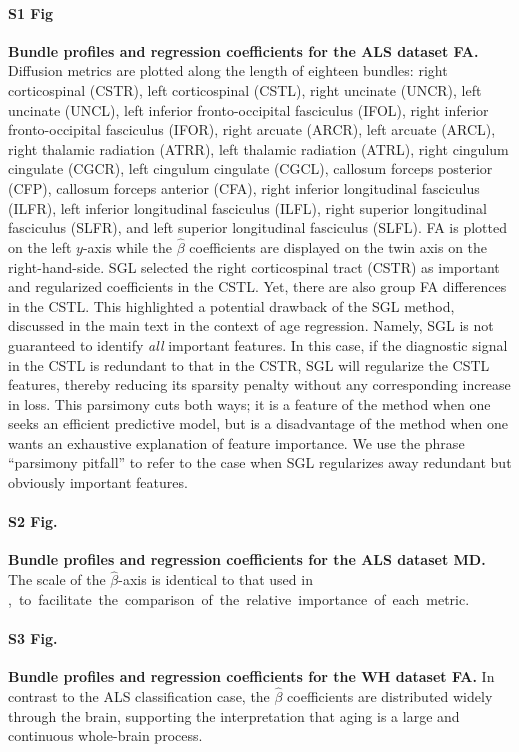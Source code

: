 \documentclass[10pt,letterpaper]{article}
\begin{document}
\paragraph{S1 Fig}
\label{S1_Fig}
{\bf Bundle profiles and regression coefficients for the ALS dataset FA.}
Diffusion metrics are plotted
along the length of eighteen bundles:
right corticospinal (CSTR),
left corticospinal (CSTL),
right uncinate (UNCR),
left uncinate (UNCL),
left inferior fronto-occipital fasciculus (IFOL),
right inferior fronto-occipital fasciculus (IFOR),
right arcuate (ARCR),
left arcuate (ARCL),
right thalamic radiation (ATRR),
left thalamic radiation (ATRL),
right cingulum cingulate (CGCR),
left cingulum cingulate (CGCL),
callosum forceps posterior (CFP),
callosum forceps anterior (CFA),
right inferior longitudinal fasciculus (ILFR),
left inferior longitudinal fasciculus (ILFL),
right superior longitudinal fasciculus (SLFR),
and left superior longitudinal fasciculus (SLFL).
FA is plotted on the left $y$-axis while the $\hat{\beta}$ coefficients are displayed on the twin axis on the right-hand-side. SGL selected
the right corticospinal tract (CSTR) as important and regularized coefficients
in the CSTL. Yet, there are also group FA differences in the
CSTL. This highlighted a potential drawback of the SGL method, discussed in the
main text in the context of age regression. Namely, SGL is not guaranteed to
identify \emph{all} important features. In this case, if the diagnostic signal
in the CSTL is redundant to that in the CSTR, SGL will regularize the CSTL
features, thereby reducing its sparsity penalty without any corresponding
increase in loss. This parsimony cuts both ways; it is a feature of the method
when one seeks an efficient predictive model, but is a disadvantage of the
method when one wants an exhaustive explanation of feature importance. We use the phrase ``parsimony pitfall'' to refer to the case when SGL regularizes
away redundant but obviously important features.

\paragraph*{S2 Fig.}
\label{S2_Fig}
{\bf Bundle profiles and regression coefficients for the ALS dataset MD.}
The scale of the $\hat{\beta}$-axis is identical to that used in \mbox{, to facilitate the comparison of the relative importance of each metric.}

\paragraph*{S3 Fig.}
\label{S3_Fig}
{\bf Bundle profiles and regression coefficients for the WH dataset FA.}
In contrast to the ALS classification case,
the $\hat{\beta}$ coefficients are distributed widely through the brain, supporting the interpretation that aging is a large and continuous whole-brain process.
\end{document}
